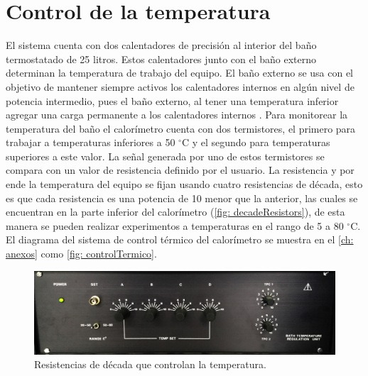 
%




\chapter{Control de la temperatura}
	El sistema cuenta con dos calentadores de precisión al interior del baño termostatado de 25 litros. Estos calentadores junto con el ba\~no externo determinan la temperatura de trabajo del equipo. El ba\~no externo se usa con el objetivo de mantener siempre activos los calentadores internos en alg\'un nivel de potencia intermedio, pues el ba\~no externo, al tener una temperatura inferior agregar una carga permanente a los calentadores internos \cite{Suurkuusk}. Para monitorear la temperatura del ba\~no el calor\'imetro cuenta con dos termistores, el primero para trabajar a temperaturas inferiores a 50 $^\circ$C y el segundo para temperaturas superiores a este valor. La se\~nal generada por uno de estos termistores se compara con un valor de resistencia definido por el usuario. La resistencia y por ende la temperatura del equipo se fijan usando cuatro resistencias de década, esto es que cada resistencia es una potencia de 10 menor que la anterior, las cuales se encuentran en la parte inferior del calor\'imetro (\autoref{fig: decadeResistors}), de esta manera se pueden realizar experimentos a temperaturas en el rango de 5 a 80 $^\circ$C. El diagrama del sistema de control t\'ermico del calor\'imetro se muestra en el \autoref{ch: anexos} como \autoref{fig: controlTermico}.
	
	\begin{figure}[h]
		\centering
		\includegraphics[width=\linewidth]{Figures/decadeResistors}
		\caption{Resistencias de década que controlan la temperatura.}
		\label{fig: decadeResistors}
	\end{figure}
	
